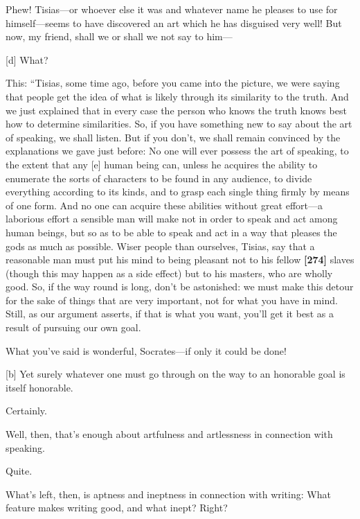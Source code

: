 \saysocrates Phew! Tisias---or whoever else it was and whatever name he
pleases to use for
himself---seems
to have discovered an art which he has disguised very well! But now, my
friend, shall we or shall we not say to him---

{[}d{]} \sayphaedrus What?

\saysocrates This: “Tisias, some time ago, before you came into the
picture, we were saying that people get the idea of what is likely
through its similarity to the truth. And we just explained that in every
case the person who knows the truth knows best how to determine
similarities. So, if you have something new to say about the art of
speaking, we shall listen. But if you don't, we shall remain convinced
by the explanations we gave just before: No one will ever possess the
art of speaking, to the extent that any {[}e{]} human being can, unless
he acquires the ability to enumerate the sorts of characters to be found
in any audience, to divide everything according to its kinds, and to
grasp each single thing firmly by means of one form. And no one can
acquire these abilities without great effort---a laborious effort a
sensible man will make not in order to speak and act among human beings,
but so as to be able to speak and act in a way that pleases the gods as
much as possible. Wiser people than ourselves, Tisias, say that a
reasonable man must put his mind to being pleasant not to his fellow
{\bf {[}274{]}} slaves (though this may happen as a side effect) but to
his masters, who are wholly good. So, if the way round is long, don't be
astonished: we must make this detour for the sake of things that are
very important, not for what you have in mind. Still, as our argument
asserts, if that is what you want, you'll get it best as a result of
pursuing our own goal.

\sayphaedrus What you've said is wonderful, Socrates---if only it could be
done!

{[}b{]} \saysocrates Yet surely whatever one must go through on the way to
an honorable goal is itself honorable.

\sayphaedrus Certainly.

\saysocrates Well, then, that's enough about artfulness and artlessness in
connection with speaking.

\sayphaedrus Quite.

\saysocrates What's left, then, is aptness and ineptness in connection with
writing: What feature makes writing good, and what inept? Right?

